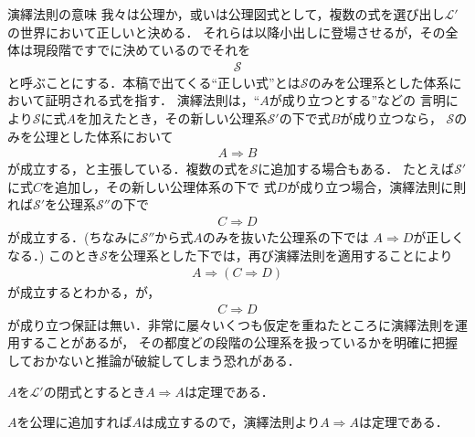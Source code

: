 	\begin{itembox}[l]{演繹法則の意味}
		我々は公理か，或いは公理図式として，複数の式を選び出し$\mathcal{L}'$の世界において正しいと決める．
		それらは以降小出しに登場させるが，その全体は現段階ですでに決めているのでそれを
		\begin{align}
			\mathscr{S}
		\end{align}
		と呼ぶことにする．本稿で出てくる``正しい式''とは$\mathscr{S}$のみを公理系とした体系において証明される式を指す．
		演繹法則は，``$A$が成り立つとする''などの
		言明により$\mathscr{S}$に式$A$を加えたとき，その新しい公理系$\mathscr{S}'$の下で式$B$が成り立つなら，
		$\mathscr{S}$のみを公理とした体系において
		\begin{align}
			A \Longrightarrow B
		\end{align}
		が成立する，と主張している．複数の式を$\mathscr{S}$に追加する場合もある．
		たとえば$\mathscr{S}'$に式$C$を追加し，その新しい公理体系の下で
		式$D$が成り立つ場合，演繹法則に則れば$\mathscr{S}'$を公理系$\mathscr{S}''$の下で
		\begin{align}
			C \Longrightarrow D
		\end{align}
		が成立する．(ちなみに$\mathscr{S}''$から式$A$のみを抜いた公理系の下では
		$A \Longrightarrow D$が正しくなる．)
		このとき$\mathscr{S}$を公理系とした下では，再び演繹法則を適用することにより
		\begin{align}
			A \Longrightarrow (C \Longrightarrow D)
		\end{align}
		が成立するとわかる，が，
		\begin{align}
			C \Longrightarrow D
		\end{align}
		が成り立つ保証は無い．非常に屡々いくつも仮定を重ねたところに演繹法則を運用することがあるが，
		その都度どの段階の公理系を扱っているかを明確に把握しておかないと推論が破綻してしまう恐れがある．
	\end{itembox}
	
	\begin{screen}
		\begin{metathm}[含意の反射律]\label{metathm:reflective_law_of_implication}
			$A$を$\mathcal{L}'$の閉式とするとき$A \Longrightarrow A$は定理である．
		\end{metathm}
	\end{screen}
	
	\begin{prf}
		$A$を公理に追加すれば$A$は成立するので，演繹法則より$A \Longrightarrow A$は定理である．
		\QED
	\end{prf}
	
